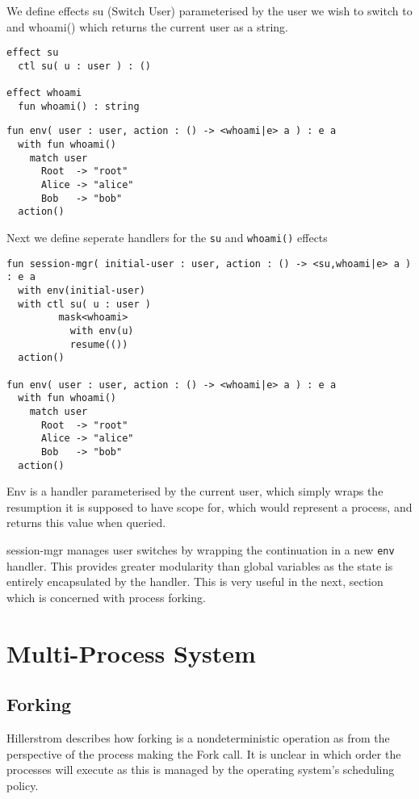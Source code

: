 \documentclass[logo,bsc,singlespacing,parskip]{infthesis}
\begin{document}
We define effects su (Switch User) parameterised by the user we wish to switch to and whoami() which returns the current user as a string.
\begin{lstlisting}
effect su
  ctl su( u : user ) : ()

effect whoami
  fun whoami() : string
\end{lstlisting}


\begin{lstlisting}
fun env( user : user, action : () -> <whoami|e> a ) : e a
  with fun whoami() 
    match user
      Root  -> "root"
      Alice -> "alice"
      Bob   -> "bob"
  action()
\end{lstlisting}

Next we define seperate handlers for the \texttt{su} and \texttt{whoami()} effects 
\begin{lstlisting}
fun session-mgr( initial-user : user, action : () -> <su,whoami|e> a ) : e a
  with env(initial-user)
  with ctl su( u : user )
         mask<whoami>
           with env(u)
           resume(())
  action()

fun env( user : user, action : () -> <whoami|e> a ) : e a
  with fun whoami() 
    match user
      Root  -> "root"
      Alice -> "alice"
      Bob   -> "bob"
  action()
\end{lstlisting}

Env is a handler parameterised by the current user, which simply wraps the resumption it is supposed to have scope for, which would represent a process, and returns this value when queried. 

session-mgr manages user switches by wrapping the continuation in a new \texttt{env} handler. This provides greater modularity than global variables as the state is entirely encapsulated by the handler. This is very useful in the next, section which is concerned with process forking.

\section{Multi-Process System}
\subsection*{Forking}
Hillerstrom describes how forking is a nondeterministic operation as from the perspective of the process making the Fork call. It is unclear in which order the processes will execute as this is managed by the operating system's scheduling policy. 
\end{document}
